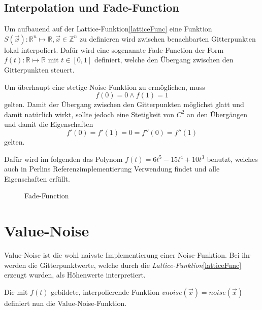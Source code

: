 \subsection{Interpolation und Fade-Function}
Um aufbauend auf der Lattice-Funktion\ref{latticeFunc} eine Funktion $S(\vec{x}): \mathbb{R}^n\mapsto\mathbb{R}, \vec{x}\in \mathbb{Z}^n$\label{S} zu definieren wird zwischen benachbarten Gitterpunkten lokal interpoliert. Dafür wird eine sogenannte Fade-Function\cite{fadeFunction} der Form $f(t): \mathbb{R}\mapsto\mathbb{R}$ mit $t\in[0, 1]$ definiert, welche den Übergang zwischen den Gitterpunkten steuert.

Um überhaupt eine stetige Noise-Funktion zu ermöglichen, muss 
\begin{equation}
f(0) = 0 \land f(1) = 1
\end{equation} gelten.
Damit der Übergang zwischen den Gitterpunkten möglichst glatt und damit natürlich wirkt, sollte jedoch eine Stetigkeit von $C^2$ an den Übergängen und damit die Eigenschaften 
\begin{equation}
	f'(0) = f'(1) = 0 = f''(0) = f''(1)
\end{equation} 
gelten.

Dafür wird im folgenden das Polynom $f(t) = 6t^5-15t^4+10t^3$ benutzt, welches auch in Perlins Referenzimplementierung Verwendung findet\cite{BurgerGradientNoise2008} und alle Eigenschaften erfüllt.
\begin{figure}[!hbtp]%
	\centering
	\caption{Fade-Function}
\end{figure}


\section{Value-Noise}\label{Value-Noise}
Value-Noise ist die wohl naivste Implementierung einer Noise-Funktion. Bei ihr werden die Gitterpunktwerte, welche durch die \emph{Lattice-Funktion}\ref{latticeFunc} erzeugt wurden, als Höhenwerte interpretiert.

Die mit $f(t)$ gebildete, interpolierende Funktion $vnoise(\vec{x}) = noise(\vec{x})$ definiert nun die Value-Noise-Funktion.

